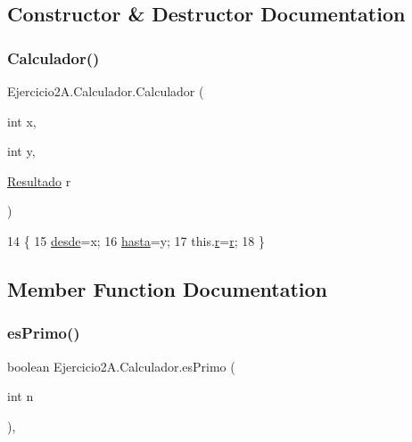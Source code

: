 \subsection{Constructor \& Destructor Documentation}
\mbox{\label{class_ejercicio2_a_1_1_calculador_aa26e86c9fd5acc5286690755c902a730}} 
\subsubsection{\texorpdfstring{Calculador()}{Calculador()}}
{\footnotesize\ttfamily Ejercicio2\+A.\+Calculador.\+Calculador (\begin{DoxyParamCaption}\item[{int}]{x,  }\item[{int}]{y,  }\item[{\mbox{\hyperlink{class_ejercicio2_a_1_1_resultado}{Resultado}}}]{r }\end{DoxyParamCaption})\hspace{0.3cm}{\ttfamily [inline]}}


\begin{DoxyCode}
14     \{
15         \mbox{\hyperlink{class_ejercicio2_a_1_1_calculador_a6ebfdfea1d0c6653247acb86c26a1074}{desde}}=x;
16         \mbox{\hyperlink{class_ejercicio2_a_1_1_calculador_adf1394308939996bb06ea2f9aaedb9ca}{hasta}}=y;
17         this.\mbox{\hyperlink{class_ejercicio2_a_1_1_calculador_aca421155f90fac2acf41c69639bbd940}{r}}=\mbox{\hyperlink{class_ejercicio2_a_1_1_calculador_aca421155f90fac2acf41c69639bbd940}{r}};
18     \}
\end{DoxyCode}


\subsection{Member Function Documentation}
\mbox{\label{class_ejercicio2_a_1_1_calculador_a6036c26ba5a2d108d6316dc3ad2c52d2}} 
\subsubsection{\texorpdfstring{es\+Primo()}{esPrimo()}}
{\footnotesize\ttfamily boolean Ejercicio2\+A.\+Calculador.\+es\+Primo (\begin{DoxyParamCaption}\item[{int}]{n }\end{DoxyParamCaption})\hspace{0.3cm}{\ttfamily [inline]}, {\ttfamily [private]}}



